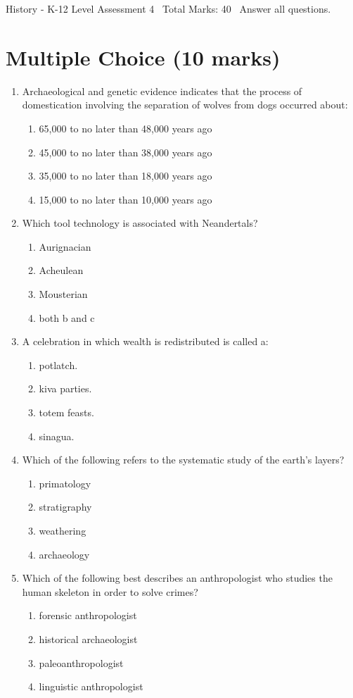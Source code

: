 \documentclass[12pt]{article}
\begin{document}
\begin{center}
History - K-12 Level Assessment 4 \
Total Marks: 40 \
Answer all questions.
\end{center}

\section*{Multiple Choice (10 marks)}
\begin{enumerate}[label=\arabic*.]
\item Archaeological and genetic evidence indicates that the process of domestication involving
the separation of wolves from dogs occurred about:
\begin{enumerate}[label=(\alph*)]
    \item 65,000 to no later than 48,000 years ago
    \item 45,000 to no later than 38,000 years ago
    \item 35,000 to no later than 18,000 years ago
    \item 15,000 to no later than 10,000 years ago
\end{enumerate}
\item Which tool technology is associated with Neandertals?
\begin{enumerate}[label=(\alph*)]
    \item Aurignacian
    \item Acheulean
    \item Mousterian
    \item both b and c
\end{enumerate}
\item A celebration in which wealth is redistributed is called a:
\begin{enumerate}[label=(\alph*)]
    \item potlatch.
    \item kiva parties.
    \item totem feasts.
    \item sinagua.
\end{enumerate}
\item Which of the following refers to the systematic study of the earth's layers?
\begin{enumerate}[label=(\alph*)]
    \item primatology
    \item stratigraphy
    \item weathering
    \item archaeology
\end{enumerate}
\item Which of the following best describes an anthropologist who studies the human skeleton in
order to solve crimes?
\begin{enumerate}[label=(\alph*)]
    \item forensic anthropologist
    \item historical archaeologist
    \item paleoanthropologist
    \item linguistic anthropologist
\end{enumerate}
\end{enumerate}
\end{document}
